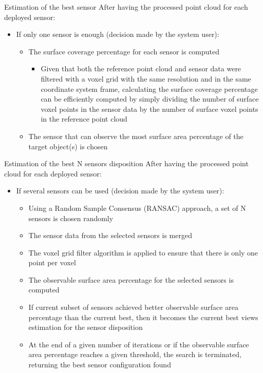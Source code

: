 \begin{frame}{Estimation of the best sensor}
	After having the processed point cloud for each deployed sensor:
	\begin{itemize}
		\item If only one sensor is enough (decision made by the system user):
		\begin{itemize}
			\item The surface coverage percentage for each sensor is computed
			\begin{itemize}
				\item Given that both the reference point cloud and sensor data were filtered with a voxel grid with the same resolution and in the same coordinate system frame, calculating the surface coverage percentage can be efficiently computed by simply dividing the number of surface voxel points in the sensor data by the number of surface voxel points in the reference point cloud
			\end{itemize}
			\item The sensor that can observe the most surface area percentage of the target object(s) is chosen
		\end{itemize}
	\end{itemize}
\end{frame}


\begin{frame}{Estimation of the best N sensors disposition}
	After having the processed point cloud for each deployed sensor:
	\begin{itemize}
		\item If several sensors can be used (decision made by the system user):
		\begin{itemize}
			\item Using a Random Sample Consensus (RANSAC) approach, a set of N sensors is chosen randomly
			\item The sensor data from the selected sensors is merged
			\item The voxel grid filter algorithm is applied to ensure that there is only one point per voxel
			\item The observable surface area percentage for the selected sensors is computed
			\item If current subset of sensors achieved better observable surface area percentage than the current best, then it becomes the current best views estimation for the sensor disposition
			\item At the end of a given number of iterations or if the observable surface area percentage reaches a given threshold, the search is terminated, returning the best sensor configuration found
		\end{itemize}
	\end{itemize}
\end{frame}


